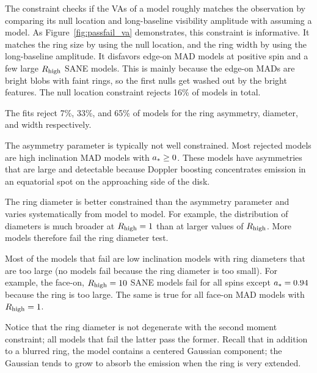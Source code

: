 The \vam constraint checks if the VAs of a model roughly matches the
observation by comparing its null location and long-baseline visibility
amplitude with assuming a model.
As Figure~\ref{fig:passfail_va} demonstrates, this constraint is
informative.
It matches the ring size by using the null location, and the ring
width by using the long-baseline amplitude.
It disfavors edge-on MAD models at positive spin and a few large $R_\mathrm{high}$
SANE models.
This is mainly because the edge-on MADs are bright blobs with faint rings, so the first nulls get washed out by the bright features.
The null location constraint rejects 16\% of models in total.

\label{sec:mring}

The \mring fits reject 7\%, 33\%, and 65\% of models for the ring asymmetry, diameter, and width respectively.

The asymmetry parameter is typically not well constrained. Most rejected models are high inclination MAD models with $a_* \ge 0$.  These models have asymmetries that are large and detectable because Doppler boosting concentrates emission in an equatorial spot on the approaching side of the disk.


The ring diameter is better constrained than the asymmetry parameter and varies systematically from model to model. For example, the distribution of diameters is much broader at $R_\mathrm{high} = 1$ than at larger values of $R_\mathrm{high}$.  More models therefore fail the ring diameter test.

Most of the models that fail are low inclination models with ring diameters that are too large (no models fail because the ring diameter is too small).  For example, the face-on, $R_\mathrm{high} = 10$ SANE models fail for all spins except $a_* = 0.94$ because the ring is too large.  The same is true for all face-on MAD models with $R_\mathrm{high} = 1$.

Notice that the ring diameter is not degenerate with the second moment constraint; all models that fail the latter pass the former.  Recall that in addition to a blurred ring, the \mrings model contains a centered Gaussian component; the Gaussian tends to grow to absorb the emission when the ring is very extended.


